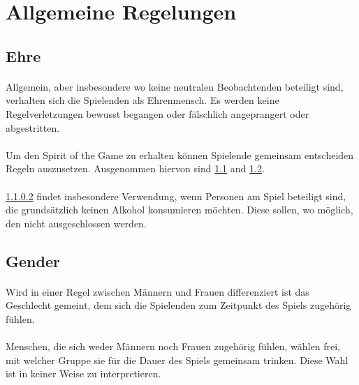 \section{Allgemeine Regelungen}\label{Allgemeine_Regelungen}

\subsection{Ehre}\label{Allgemeine_Regelungen:Ehre}
\paragraph{} Allgemein, aber insbesondere wo keine neutralen Beobachtenden beteiligt sind, verhalten sich die Spielenden als Ehrenmensch.
Es werden keine Regelverletzungen bewusst begangen oder fälschlich angeprangert oder abgestritten.

\paragraph{}\label{Allgemeine_Regelungen:Ehre:Spirit}
Um den \glqq Spirit of the Game\grqq{} zu erhalten können Spielende gemeinsam entscheiden Regeln auszusetzen.
Ausgenommen hiervon sind \ref{Allgemeine_Regelungen:Ehre} and \ref{Allgemeine_Regelungen:Gender}.

\paragraph{}
\ref{Allgemeine_Regelungen:Ehre:Spirit} findet insbesondere Verwendung, wenn Personen am Spiel beteiligt sind, die grundsätzlich keinen Alkohol konsumieren möchten.
Diese sollen, wo möglich, den nicht ausgeschlossen werden.

\subsection{Gender}\label{Allgemeine_Regelungen:Gender}
\paragraph{}
Wird in einer Regel zwischen Männern und Frauen differenziert ist das Geschlecht gemeint, dem sich die Spielenden zum Zeitpunkt des Spiels zugehörig fühlen.

\paragraph{}
Menschen, die sich weder Männern noch Frauen zugehörig fühlen, wählen frei, mit welcher Gruppe sie für die Dauer des Spiels gemeinsam trinken.
Diese Wahl ist in keiner Weise zu interpretieren.

